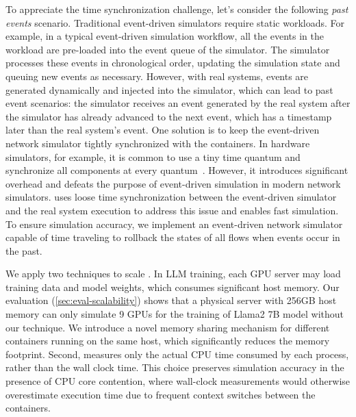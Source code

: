 To appreciate the time synchronization challenge, let's consider the following \textit{past events} scenario.
Traditional event-driven simulators require static workloads. For example, in a typical event-driven simulation workflow, all the events in the workload are pre-loaded into the event queue of the simulator. The simulator processes these events in chronological order, updating the simulation state and queuing new events as necessary. However, with real systems, events are generated dynamically and injected into the simulator, which can lead to past event scenarios: the simulator receives an event generated by the real system after the simulator has already advanced to the next event, which has a timestamp later than the real system's event.
One solution is to keep the event-driven network simulator tightly synchronized with the containers. In hardware simulators, for example, it is common to use a tiny time quantum and synchronize all components at every quantum~\cite{reinhardt1993wwt,mukherjee2000wwt}. However, it introduces significant overhead and defeats the purpose of event-driven simulation in modern network simulators.
\sys uses loose time synchronization between the event-driven simulator and the real system execution to address this issue and enables fast simulation. To ensure simulation accuracy, we implement an event-driven network simulator capable of time traveling to rollback the states of all flows when events occur in the past.


We apply two techniques to scale \sys. In LLM training, each GPU server may load training data and model weights, which consumes significant host memory. Our evaluation (\autoref{sec:eval-scalability}) shows that a physical server with 256GB host memory can only simulate 9 GPUs for the training of Llama2 7B model without our technique. We introduce a novel memory sharing mechanism for different containers running on the same host, which significantly reduces the memory footprint. 
Second, \sys measures only the actual CPU time consumed by each process, rather than the wall clock time. This choice preserves simulation accuracy in the presence of CPU core contention, where wall-clock measurements would otherwise overestimate execution time due to frequent context switches between the containers.
